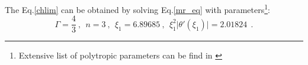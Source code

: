 \documentclass[oneside,a4paper,11pt]{report}
\begin{document}
The Eq.\eqref{chlim} can be obtained by solving Eq.\eqref{mr_eq} with parameters\footnote{Extensive list of polytropic parameters can be find in
\citet{1939MNRAS..99..673C}}:
\begin{equation}
\Gamma = \frac{4}{3}\:,\:\: n =3 \:,\:\: \xi_1 = 6.89685 \:,\:\: \xi_1^2 \lvert \theta' (\xi_1) \lvert = 2.01824\:\:. 
\end{equation}
                                                                                                                                                                                                                                                                                                                                                                                                                                                                                                                                                                                                                                                                                                                                                                                                                                                                                                                                                                                                                                                                                                                                                                                                                                                                                                                                                                                                                                                                                                                                                                                                                                                                                                                                                                                                                                                                                                                                                                                                                                                                                                                                                                                                                                                                                                                                                                                                                                                                                                                                                                                                                                                                                                                                                                                                                                                                                                                                                                                                  
\end{document}

